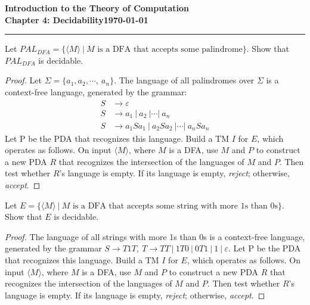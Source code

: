 \documentclass[11pt]{article}
\newcommand{\dated}{\today}
\begin{document}
\textbf{Introduction to the Theory of
Computation}\hfill\textbf{\myname}\\[0.01in]
\textbf{Chapter 4: Decidability}\hfill\textbf{\dated}\\
\smallskip\hrule\bigskip

\begin{problem}{4.26}
Let $PAL_{DFA} = \{\langle M \rangle \ | \ M \text{ is a DFA that accepts some palindrome}\}$. Show that $PAL_{DFA}$ is decidable.
\end{problem}

\begin{proof}
Let $\Sigma = \{a_1, a_2, \cdots, \ a_n\}$. The language of all palindromes over $\Sigma$ is a context-free language, generated by the grammar:
\begin{align*}
S &\rightarrow \varepsilon \\
S &\rightarrow a_1 \ | \ a_2 \ | \cdots | \ a_n \\
S &\rightarrow a_1Sa_1 \ | \ a_2Sa_2 \ | \cdots | \ a_nSa_n
\end{align*}
Let P be the PDA that recognizes this language. Build a TM $I$ for $E$, which operates as follows. On input $\langle M \rangle$, where $M$ is a DFA, use $M$ and $P$ to construct a new PDA $R$ that recognizes the intersection of the languages of $M$ and $P$. Then test whether $R$'s language is empty. If its language is empty, \textit{reject}; otherwise, \textit{accept}.
\end{proof}

\begin{problem}{4.27}
Let $E = \{\langle M \rangle \ | \ M \text{ is a DFA that accepts some string with more 1s than 0s}\}$. Show that $E$ is decidable.
\end{problem}

\begin{proof}
The language of all strings with more 1s than 0s is a context-free language, generated by the grammar $S \longrightarrow T1T, \ T \longrightarrow TT \ | \ 1T0 \ | \ 0T1 \ |\  1 \ | \ \varepsilon$. Let P be the PDA that recognizes this language. Build a TM $I$ for $E$, which operates as follows. On input $\langle M \rangle$, where $M$ is a DFA, use $M$ and $P$ to construct a new PDA $R$ that recognizes the intersection of the languages of $M$ and $P$. Then test whether $R$'s language is empty. If its language is empty, \textit{reject}; otherwise, \textit{accept}.
\end{proof}
\end{document}
